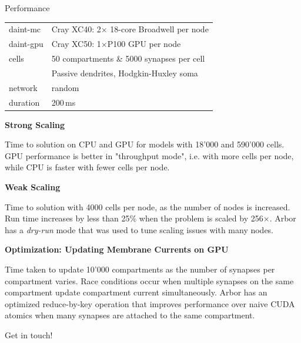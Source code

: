 \documentclass[a0paper,portrait]{baposter}
\newcommand{\arbor}{{\textcolor{blue!30!black}{Arbor}}\xspace}
\newcommand{\imageheader}[1]{\begin{center}\bfseries\large{#1}\end{center} \vspace{-2pt}}
\newcommand{\newemph}[1]{{\color{blue}\em #1}}
\begin{document}
\begin{poster}
\begin{posterbox}[name=plots,column=2,row=0,span=1]{Performance}
    {
        \tiny
        \colorbox[HTML]{FCF3CF}{%
            \begin{tabularx}{0.95\textwidth}{l|X}
          daint-mc  & Cray XC40: 2$\times$ 18-core Broadwell per node\smallskip\\
          daint-gpu & Cray XC50: 1$\times$P100 GPU per node\smallskip\\
              cells & 50 compartments \& 5000 synapses per cell\\
                    & Passive dendrites, Hodgkin-Huxley soma\smallskip\\
            network & random\smallskip\\
           duration & 200\,ms\\
            \end{tabularx}
        }
    }
    \vskip4pt
    \imageheader{Strong Scaling}
    
    \vskip4pt
    { \small
    Time to solution on CPU and GPU for models with 18'000 and 590'000 cells. GPU performance is better in "throughput mode", i.e. with more cells per node, while CPU is faster with fewer cells per node.
    }

    \imageheader{Weak Scaling}
    
    \vskip4pt
    { \small
    Time to solution with 4000 cells per node, as the number of nodes is increased. Run time increases by less than 25\% when the problem is scaled by 256$\times$. \arbor has a \newemph{dry-run} mode that was used to tune scaling issues with many nodes.
    }

    \imageheader{Optimization: Updating Membrane Currents on GPU}
    
    { \small
    Time taken to update 10'000 compartments as the number of synapses per compartment varies.
    Race conditions occur when multiple synapses on the same compartment update compartment current simultaneously. \arbor has an optimized reduce-by-key operation that improves performance over naive CUDA atomics when many synapses are attached to the same compartment.
    }
    \vspace{0pt}
\end{posterbox}
\begin{posterbox}[name=contact,column=2,below=plots,span=1,headerColorOne=blue!40!black,headerFontColor=white]{Get in touch!}
    \centering


\end{posterbox}
\end{poster}
\end{document}
